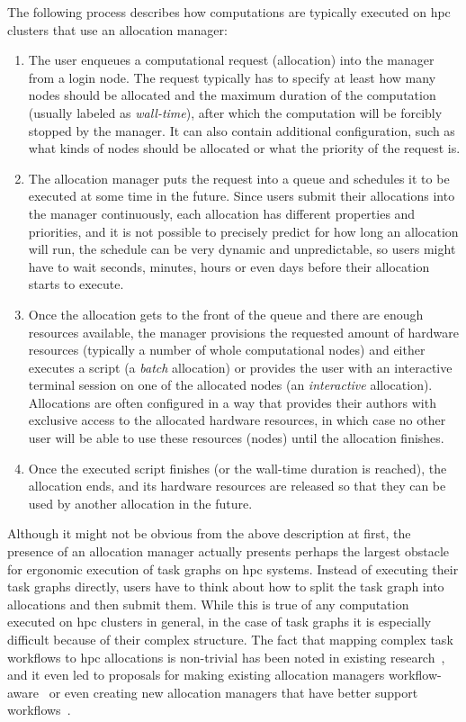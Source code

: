 The following process describes how computations are typically executed on
\gls{hpc} clusters that use an allocation manager:

\begin{enumerate}
	\item The user enqueues a computational request (allocation) into the manager from a login node. The
	      request typically has to specify at least how many nodes should be allocated and the maximum
	      duration of the computation (usually labeled as \emph{wall-time}), after which the
	      computation will be forcibly stopped by the manager. It can also contain additional configuration,
	      such as what kinds of nodes should be allocated or what the priority of the request is.
	\item The allocation manager puts the request into a queue and schedules it to be executed at some time
	      in the future. Since users submit their allocations into the manager continuously, each allocation
	      has different properties and priorities, and it is not possible to precisely predict for how long
	      an allocation will run, the schedule can be very dynamic and unpredictable, so users might have to
	      wait seconds, minutes, hours or even days before their allocation starts to execute.
	\item Once the allocation gets to the front of the queue and there are enough resources available, the
	      manager provisions the requested amount of hardware resources (typically a number of whole
	      computational nodes) and either executes a script (a \emph{batch} allocation) or
	      provides the user with an interactive terminal session on one of the allocated nodes (an
	      \emph{interactive} allocation). Allocations are often configured in a way that provides
	      their authors with exclusive access to the allocated hardware resources, in which case no other
	      user will be able to use these resources (nodes) until the allocation finishes.
	\item Once the executed script finishes (or the wall-time duration is reached), the allocation ends, and
	      its hardware resources are released so that they can be used by another allocation in the future.
\end{enumerate}

Although it might not be obvious from the above description at first, the presence of an allocation
manager actually presents perhaps the largest obstacle for ergonomic execution of task graphs on
\gls{hpc} systems. Instead of executing their task graphs directly, users have to
think about how to split the task graph into allocations and then submit them. While this is true
of any computation executed on \gls{hpc} clusters in general, in the case of task
graphs it is especially difficult because of their complex structure. The fact that mapping complex
task workflows to \gls{hpc} allocations is non-trivial has been noted in existing
research~\cite{glume,slurm-workflow}, and it even led to proposals for making existing allocation
managers workflow-aware~\cite{slurm-workflow} or even creating new allocation managers that
have better support workflows~\cite{flux}.

